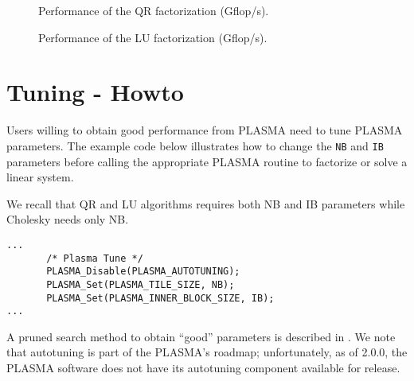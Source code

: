 \begin{figure}[htbp]
  \caption{Performance of the QR factorization (Gflop/s).}
  \label{fig:qr}
\end{figure}

\begin{figure}[htbp]
  \caption{Performance of the LU factorization (Gflop/s).}
  \label{fig:lu}
\end{figure}

\section{Tuning - Howto}

Users willing to obtain good performance from PLASMA need to tune PLASMA
parameters.  The example code below illustrates how to change the \texttt{NB}
and \texttt{IB} parameters before calling the appropriate PLASMA routine to
factorize or solve a linear system.

We recall that QR and LU algorithms requires both NB and IB parameters while Cholesky needs only NB.


\begin{verbatim}
...
       /* Plasma Tune */
       PLASMA_Disable(PLASMA_AUTOTUNING);
       PLASMA_Set(PLASMA_TILE_SIZE, NB);
       PLASMA_Set(PLASMA_INNER_BLOCK_SIZE, IB);
...
\end{verbatim}


A pruned search method to obtain ``good''
parameters is described in \cite{Agullo:2009:CS1}.  We note that autotuning is
part of the PLASMA's roadmap; unfortunately, as of 2.0.0, the PLASMA software
does not have its autotuning component available for release.


